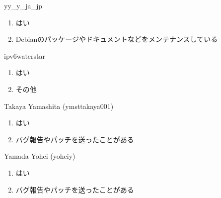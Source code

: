 \begin{prework}{ yy\_y\_ja\_jp }
  \begin{enumerate}
  \item はい
  \item Debianのパッケージやドキュメントなどをメンテナンスしている
  \end{enumerate}
\end{prework}

\begin{prework}{ ipv6waterstar }
  \begin{enumerate}
  \item はい
  \item その他
  \end{enumerate}
\end{prework}

\begin{prework}{ Takaya Yamashita (ymsttakaya001) }
  \begin{enumerate}
  \item はい
  \item バグ報告やパッチを送ったことがある
  \end{enumerate}
\end{prework}

\begin{prework}{ Yamada Yohei (yoheiy) }
  \begin{enumerate}
  \item はい
  \item バグ報告やパッチを送ったことがある
  \end{enumerate}
\end{prework}
